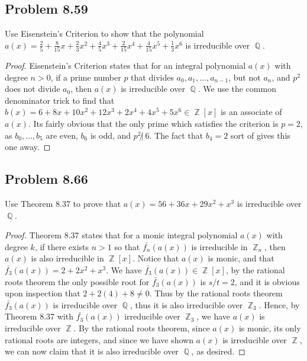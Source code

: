 \documentclass[letterpaper, 12pt]{amsart}
\DeclareMathOperator{\Z}{\mathbb{Z}}
\DeclareMathOperator{\Q}{\mathbb{Q}}
\begin{document}
	\subsection*{Problem 8.59}
	\label{sub:probem_8_59}
	Use Eisenstein's Criterion to show that the polynomial $a(x) = \frac{2}{5} + \frac{8}{15}x + \frac{2}{3}x^{2} + \frac{4}{5}x^{3} + \frac{2}{15}x^{4} + \frac{4}{15}x^{5} + \frac{1}{3}x^{6}$ is irreducible over $\Q$.
		\begin{proof}
		Eisenstein's Criterion states that for an integral polynomial $a(x)$ with degree $n > 0$, if a prime number $p$ that divides $a_{0}, a_{1}, \dots, a_{n-1}$, but not $a_{n}$, and $p^{2}$ does not divide $a_{0}$, then $a(x)$ is irreducible over $\Q$.
		We use the common denominator trick to find that $b(x) = 6 + 8x + 10x^{2} + 12x^{3} + 2x^{4} + 4x^{5} + 5x^{6} \in \Z[x]$ is an associate of $a(x)$.
		Its fairly obvious that the only prime which satisfies the criterion is $p=2$, as $b_{0}, \dots, b_{5}$ are even, $b_{6}$ is odd, and $p^{2} \not| \ 6$.
		The fact that $b_{4} = 2$ sort of gives this one away.
		\end{proof}

	\subsection*{Problem 8.66}
	\label{sub:probem_8_66}
	Use Theorem 8.37 to prove that $a(x) = 56 + 36x + 29x^{2} + x^{3}$ is irreducible over $\Q$.
		\begin{proof}
		Theorem 8.37 states that for a monic integral polynomial $a(x)$ with degree $k$, if there exists $n > 1$ so that $\bar{f_{n}}(a(x))$ is irreducible in $\Z_{n}$, then $a(x)$ is also irreducible in $\Z[x]$.
		Notice that $a(x)$ is monic, and that $\bar{f_{3}}(a(x)) = 2 + 2x^{2} + x^{3}$.
		We have $\bar{f_{3}}(a(x)) \in \Z[x]$, by the rational roots theorem the only possible root for $\bar{f_{3}}(a(x))$ is $s/t = 2$, and it is obvious upon inspection that $2 + 2(4) + 8 \neq 0$.
		Thus by the rational roots theorem $\bar{f_{3}}(a(x))$ is irreducible over $\Q$, thus it is also irreducible over $\Z_{3}$.
		Hence, by Theorem 8.37 with $\bar{f_{3}}(a(x))$ irreducible over $\Z_{3}$, we have $a(x)$ is irreducible over $\Z$.
		By the rational roots theorem, since $a(x)$ is monic, its only rational roots are integers, and since we have shown $a(x)$ is irreducible over $\Z$, we can now claim that it is also irreducible over $\Q$, as desired.
		\end{proof}
\end{document}
